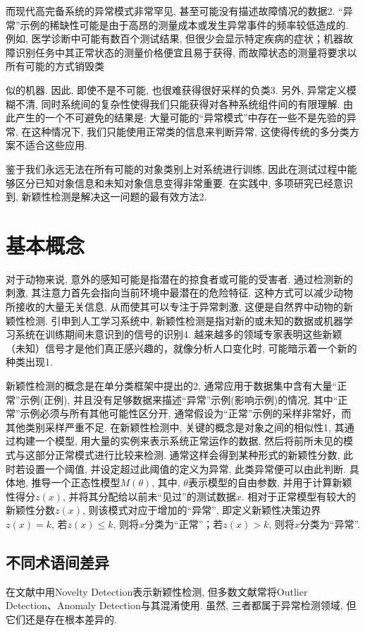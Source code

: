 \documentclass{Style/aas}
\begin{document}
而现代高完备系统的异常模式非常罕见, 甚至可能没有描述故障情况的数据2. “异常”示例的稀缺性可能是由于高昂的测量成本或发生异常事件的频率较低造成的. 例如, 医学诊断中可能有数百个测试结果, 但很少会显示特定疾病的症状；机器故障识别任务中其正常状态的测量价格便宜且易于获得, 而故障状态的测量将要求以所有可能的方式销毁类\onecolumn\begin{multicols}{2}似的机器. 因此, 即使不是不可能, 也很难获得很好采样的负类3. 另外, 异常定义模糊不清, 同时系统间的复杂性使得我们只能获得对各种系统组件间的有限理解. 由此产生的一个不可避免的结果是: 大量可能的“异常模式”中存在一些不是先验的异常, 在这种情况下, 我们只能使用正常类的信息来判断异常, 这使得传统的多分类方案不适合这些应用.

  鉴于我们永远无法在所有可能的对象类别上对系统进行训练, 因此在测试过程中能够区分已知对象信息和未知对象信息变得非常重要. 在实践中, 多项研究已经意识到, 新颖性检测是解决这一问题的最有效方法2.

  \section{基本概念}
  对于动物来说, 意外的感知可能是指潜在的掠食者或可能的受害者. 通过检测新的刺激, 其注意力首先会指向当前环境中最潜在的危险特征. 这种方式可以减少动物所接收的大量无关信息, 从而使其可以专注于异常刺激, 这便是自然界中动物的新颖性检测. 引申到人工学习系统中, 新颖性检测是指对新的或未知的数据或机器学习系统在训练期间未意识到的信号的识别4. 越来越多的领域专家表明这些新颖（未知）信号才是他们真正感兴趣的，就像分析人口变化时, 可能暗示着一个新的种类出现1.

  新颖性检测的概念是在单分类框架中提出的2, 通常应用于数据集中含有大量“正常”示例(正例), 并且没有足够数据来描述“异常”示例(影响示例)的情况, 其中“正常”示例必须与所有其他可能性区分开, 通常假设为“正常”示例的采样非常好，而其他类别采样严重不足. 在新颖性检测中, 关键的概念是对象之间的相似性1, 其通过构建一个模型, 用大量的实例来表示系统正常运作的数据, 然后将前所未见的模式与这部分正常模式进行比较来检测. 通常这样会得到某种形式的新颖性分数, 此时若设置一个阈值, 并设定超过此阈值的定义为异常, 此类异常便可以由此判断. 具体地, 推导一个正态性模型$ M\left( \theta \right) $, 其中, $\theta $表示模型的自由参数, 并用于计算新颖性得分$z\left( x \right) $, 并将其分配给以前未“见过”的测试数据$x$. 相对于正常模型有较大的新颖性分数$z\left( x \right) $, 则该模式对应于增加的“异常”, 即定义新颖性决策边界$z\left( x \right) =k$, 若$ z\left( x \right) \le k $, 则将$x$分类为“正常”；若$ z\left( x \right) >k $, 则将$x$分类为“异常”.

  \subsection{不同术语间差异}
  在文献中用Novelty Detection表示新颖性检测, 但多数文献常将Outlier Detection、Anomaly Detection与其混淆使用. 虽然, 三者都属于异常检测领域, 但它们还是存在根本差异的.


\end{multicols}
\end{document}
